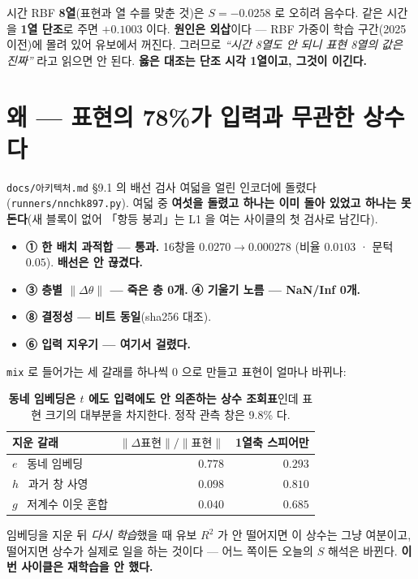 \documentclass[10pt]{article}
\begin{document}
시간 RBF \textbf{8열}(표현과 열 수를 맞춘 것)은 $S = -0.0258$ 로 오히려 음수다.
같은 시간을 \textbf{1열 단조}로 주면 $+0.1003$ 이다. \textbf{원인은 외삽}이다 ---
RBF 가중이 학습 구간(2025 이전)에 몰려 있어 유보에서 꺼진다. 그러므로
\emph{``시간 8열도 안 되니 표현 8열의 값은 진짜''} 라고 읽으면 안 된다.
\textbf{옳은 대조는 단조 시각 1열이고, 그것이 이긴다.}

\section{왜 --- 표현의 78\%가 입력과 무관한 상수다}

\texttt{docs/아키텍처.md} §9.1 의 배선 검사 여덟을 얼린 인코더에 돌렸다
(\texttt{runners/nnchk897.py}). 여덟 중 \textbf{여섯을 돌렸고 하나는 이미 돌아 있었고
하나는 못 돈다}(새 블록이 없어 「항등 붕괴」는 L1 을 여는 사이클의 첫 검사로 남긴다).

\begin{itemize}\setlength\itemsep{1pt}
\item \textbf{① 한 배치 과적합 --- 통과.} 16창을 $0.0270 \to 0.000278$
(비율 $0.0103$ · 문턱 $0.05$). \textbf{배선은 안 끊겼다.}
\item \textbf{③ 층별 $\|\Delta\theta\|$ --- 죽은 층 0개.}
\textbf{④ 기울기 노름 --- NaN/Inf 0개.}
\item \textbf{⑧ 결정성 --- 비트 동일}(sha256 대조).
\item \textbf{⑥ 입력 지우기 --- 여기서 걸렸다.}
\end{itemize}

\texttt{mix} 로 들어가는 세 갈래를 하나씩 0 으로 만들고 표현이 얼마나 바뀌나:

\begin{table}[h]\centering\tsize
\begin{tabular}{lrr}
\toprule
지운 갈래 & $\|\Delta\text{표현}\|/\|\text{표현}\|$ & 1열축 스피어만 \\
\midrule
$e$ \ 동네 임베딩 & $\mathbf{0.778}$ & $0.293$ \\
$h$ \ 과거 창 사영 & $0.098$ & $0.810$ \\
$g$ \ 저계수 이웃 혼합 & $0.040$ & $0.685$ \\
\bottomrule
\end{tabular}
\caption{\textbf{동네 임베딩은 $t$ 에도 입력에도 안 의존하는 상수 조회표}인데
표현 크기의 대부분을 차지한다. 정작 관측 창은 9.8\% 다.}
\label{tab:ablate}
\end{table}

{임베딩을 지운 뒤 \emph{다시 학습}했을 때 유보 $R^2$ 가 안 떨어지면 이 상수는
그냥 여분이고, 떨어지면 상수가 실제로 일을 하는 것이다 --- 어느 쪽이든 오늘의
$S$ 해석은 바뀐다. \textbf{이번 사이클은 재학습을 안 했다.}}
\end{document}
